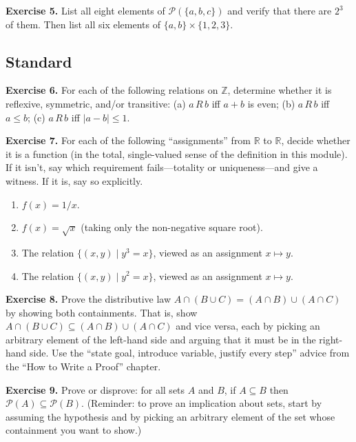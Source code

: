 \documentclass[11pt]{article}
\begin{document}
\bigskip
\noindent\textbf{Exercise 5.}\label{ex:m1:5} List all eight elements of $\mathcal{P}(\{a, b, c\})$ and verify that there are $2^3$ of them. Then list all six elements of $\{a, b\} \times \{1, 2, 3\}$.

\subsection*{Standard}

\textbf{Exercise 6.}\label{ex:m1:6} For each of the following relations on $\mathbb{Z}$, determine whether it is reflexive, symmetric, and/or transitive: (a) $a\, R\, b$ iff $a + b$ is even; (b) $a\, R\, b$ iff $a \leq b$; (c) $a\, R\, b$ iff $|a - b| \leq 1$.

\bigskip
\noindent\textbf{Exercise 7.}\label{ex:m1:7} For each of the following ``assignments'' from $\mathbb{R}$ to $\mathbb{R}$, decide whether it is a function (in the total, single-valued sense of the definition in this module). If it isn't, say which requirement fails---totality or uniqueness---and give a witness. If it is, say so explicitly.
\begin{enumerate}[label=(\alph*)]
  \item $f(x) = 1/x$.
  \item $f(x) = \sqrt{x}$ (taking only the non-negative square root).
  \item The relation $\{(x, y) \mid y^3 = x\}$, viewed as an assignment $x \mapsto y$.
  \item The relation $\{(x, y) \mid y^2 = x\}$, viewed as an assignment $x \mapsto y$.
\end{enumerate}

\bigskip
\noindent\textbf{Exercise 8.}\label{ex:m1:8} Prove the distributive law $A \cap (B \cup C) = (A \cap B) \cup (A \cap C)$ by showing both containments. That is, show $A \cap (B \cup C) \subseteq (A \cap B) \cup (A \cap C)$ and vice versa, each by picking an arbitrary element of the left-hand side and arguing that it must be in the right-hand side. Use the ``state goal, introduce variable, justify every step'' advice from the ``How to Write a Proof'' chapter.

\bigskip
\noindent\textbf{Exercise 9.}\label{ex:m1:9} Prove or disprove: for all sets $A$ and $B$, if $A \subseteq B$ then $\mathcal{P}(A) \subseteq \mathcal{P}(B)$. (Reminder: to prove an implication about sets, start by assuming the hypothesis and by picking an arbitrary element of the set whose containment you want to show.)
\end{document}
